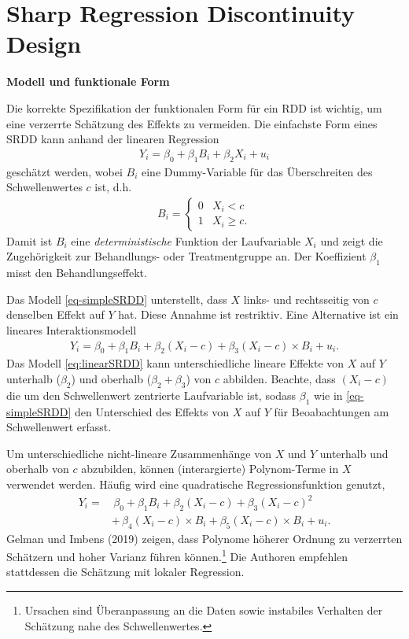 \documentclass[
  a4paper,
  DIV=11,
  oneside]{scrreprt}
\begin{document}
\hypertarget{sharp-regression-discontinuity-design}{%
\section{Sharp Regression Discontinuity
Design}\label{sharp-regression-discontinuity-design}}

\textbf{Modell und funktionale Form}

Die korrekte Spezifikation der funktionalen Form für ein RDD ist
wichtig, um eine verzerrte Schätzung des Effekts zu vermeiden. Die
einfachste Form eines SRDD kann anhand der linearen Regression
\begin{align}
Y_i = \beta_0 + \beta_1 B_i + \beta_2 X_i + u_i\label{eq-simpleSRDD}
\end{align} geschätzt werden, wobei \(B_i\) eine Dummy-Variable für das
Überschreiten des Schwellenwertes \(c\) ist, d.h. \begin{align*}
  B_i=\begin{cases}
    0 & X_i < c\\
    1 & X_i \geq c.
  \end{cases}
\end{align*} Damit ist \(B_i\) eine \emph{deterministische} Funktion der
Laufvariable \(X_i\) und zeigt die Zugehörigkeit zur Behandlungs- oder
Treatmentgruppe an. Der Koeffizient \(\beta_1\) misst den
Behandlungseffekt.

Das Modell \eqref{eq-simpleSRDD} unterstellt, dass \(X\) links- und
rechtsseitig von \(c\) denselben Effekt auf \(Y\) hat. Diese Annahme ist
restriktiv. Eine Alternative ist ein lineares Interaktionsmodell
\begin{align}
Y_i = \beta_0 + \beta_1 B_i + \beta_2 (X_i - c) + \beta_3(X_i - c)\times B_i + u_i.\label{eq:linearSRDD}
\end{align} Das Modell \eqref{eq:linearSRDD} kann unterschiedliche
lineare Effekte von \(X\) auf \(Y\) unterhalb (\(\beta_2\)) und oberhalb
(\(\beta_2 + \beta_3\)) von \(c\) abbilden. Beachte, dass \((X_i - c)\)
die um den Schwellenwert zentrierte Laufvariable ist, sodass \(\beta_1\)
wie in \eqref{eq-simpleSRDD} den Unterschied des Effekts von \(X\) auf
\(Y\) für Beoabachtungen am Schwellenwert erfasst.

Um unterschiedliche nicht-lineare Zusammenhänge von \(X\) und \(Y\)
unterhalb und oberhalb von \(c\) abzubilden, können (interargierte)
Polynom-Terme in \(X\) verwendet werden. Häufig wird eine quadratische
Regressionsfunktion genutzt, \begin{align}
  Y_i =&\, \beta_0 + \beta_1 B_i + \beta_2 (X_i - c) + \beta_3 (X_i - c)^2\\ 
       &+\, \beta_4(X_i - c)\times B_i + \beta_5(X_i - c)\times B_i + u_i.\label{eq:quadSRDD}
\end{align} Gelman und Imbens (2019) zeigen, dass Polynome höherer
Ordnung zu verzerrten Schätzern und hoher Varianz führen
können.\footnote{Ursachen sind Überanpassung an die Daten sowie
  instabiles Verhalten der Schätzung nahe des Schwellenwertes.} Die
Authoren empfehlen stattdessen die Schätzung mit lokaler Regression.
\end{document}
